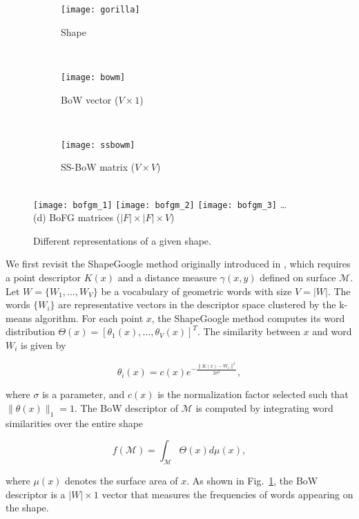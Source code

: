 \begin{figure}
\centering
\begin{subfigure}[b]{0.23\textwidth}
 \texttt{[image: gorilla]}
 \caption{\scriptsize Shape}
\end{subfigure}%
~
\begin{subfigure}[b]{0.37\textwidth}
 \texttt{[image: bowm]}
 \caption{\scriptsize BoW vector ($V \times 1$)}
\end{subfigure}%
~
\begin{subfigure}[b]{0.27\textwidth}
 \texttt{[image: ssbowm]}
 \caption{\scriptsize SS-BoW matrix ($V\times V$)}
\end{subfigure}
\\
\texttt{[image: bofgm\_1]}
\texttt{[image: bofgm\_2]}
\texttt{[image: bofgm\_3]}
\dots\\
{\scriptsize (d) BoFG matrices ($|F| \times |F| \times V$)}
\caption{Different representations of a given shape.}
\label{fig:represent}
\end{figure}

We first revisit the ShapeGoogle method originally introduced in \cite{Ovsjanikov:2009},
which requires a point descriptor $K(x)$ and a distance measure $\gamma(x,y)$ defined on
surface $\mathcal{M}$.
Let $W=\{W_1,\dots,W_V\}$ be a vocabulary of geometric words with size $V=|W|$.
The words $\{W_i\}$ are representative vectors in the descriptor space
clustered by the k-means algorithm. For each point $x$, the ShapeGoogle method computes its word
distribution $\Theta(x)=[\theta_1(x),\dots,\theta_V(x)]^T$. The similarity between $x$ and
word $W_i$ is given by

\begin{equation}\label{eq:similar}
\theta_i(x)=c(x)e^{-\frac{\|K(x)-W_i\|^2}{2\sigma^2}},
\end{equation}

where $\sigma$ is a parameter, and $c(x)$ is the normalization factor selected
such that $\|\theta(x)\|_1 = 1$. The BoW descriptor of $\mathcal{M}$ is
computed by integrating word similarities over the entire shape

\begin{equation}
f(\mathcal{M})=\int_\mathcal{M}\Theta(x)d\mu(x),
\end{equation}

where $\mu(x)$ denotes the surface area of $x$. As shown in Fig.~\ref{fig:represent},
the BoW descriptor is a $|W|\times 1$ vector that measures the frequencies of words
appearing on the shape.

